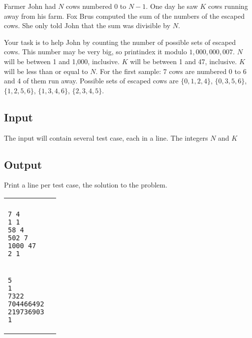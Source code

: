 Farmer John had $N$ cows numbered $0$ to $N-1$. One day he saw $K$ cows running away from his farm. Fox Brus computed the sum of the numbers of the escaped cows. She only told John that the sum was divisible by $N$. 

Your task is to help John by counting the number of possible sets of escaped cows. This number may be very big, so printindex it modulo $1,000,000,007$. $N$ will be between 1 and 1,000, inclusive. $K$ will be between 1 and 47, inclusive. $K$ will be less than or equal to $N$. For the first sample: 7 cows are numbered 0 to 6 and 4 of them run away. Possible sets of escaped cows are $\{0, 1, 2, 4\}$, $\{0, 3, 5, 6\}$, $\{1, 2, 5, 6\}$, $\{1, 3, 4, 6\}$, $\{2, 3, 4, 5\}$.

\subsection* {Input}

The input will contain several test case, each in a line. The integers $N$ and $K$

\subsection* {Output}

Print a line per test case, the solution to the problem.

\outputnotice

\vspace{12pt}
\begin{minipage}[c]{1\textwidth}%
	\begin{center}
		\begin{tabular}{|l|l|} \hline 
		\begin{minipage}[t]{0.6\textwidth}%
		\bf{Input sample} \\
		\begin{verbatim}
7 4
1 1
58 4
502 7
1000 47
2 1

\end{verbatim}
    \end{minipage}%


    \begin{minipage}[t]{0.3\textwidth}%
      \textbf{Output sample} \\      
\begin{verbatim}
5
1
7322
704466492
219736903
1

\end{verbatim}
\end{minipage}\\
    \hline
\end{tabular}\end{center}\end{minipage}%
